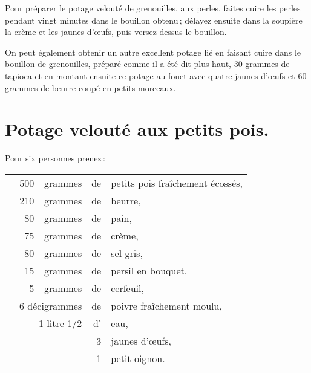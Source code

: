 Pour préparer le potage velouté de grenouilles, aux perles, faites cuire les
perles pendant vingt minutes dans le bouillon obtenu ; délayez ensuite dans la
soupière la crème et les jaunes d'œufs, puis versez dessus le bouillon.

\sk

On peut également obtenir un autre excellent potage lié en faisant cuire dans
le bouillon de grenouilles, préparé comme il a été dit plus haut, 30 grammes de
tapioca et en montant ensuite ce potage au fouet avec quatre jaunes d'œufs et
60 grammes de beurre coupé en petits morceaux.

\section*{\centering Potage velouté aux petits pois.}

\medskip

Pour six personnes prenez :

\medskip

\footnotesize
\begin{longtable}{rrrrp{16em}}   
  & 500 & grammes     & de & petits pois fraîchement écossés,                                             \\
  & 210 & grammes     & de & beurre,                                                                      \\
  &  80 & grammes     & de & pain,                                                                        \\
  &  75 & grammes     & de & crème,                                                                       \\
  &  80 & grammes     & de & sel gris,                                                                    \\
  &  15 & grammes     & de & persil en bouquet,                                                           \\
  &   5 & grammes     & de & cerfeuil,                                                                    \\
  & \multicolumn{2}{r}{6 décigrammes} & de & poivre fraîchement moulu,                                    \\
  & \multicolumn{2}{r}{1 litre 1/2}   & d' & eau,                                                         \\
  &     &             & 3  & jaunes d'œufs,                                                               \\
  &     &             & 1  & petit oignon.                                                                \\
\end{longtable}
\normalsize

